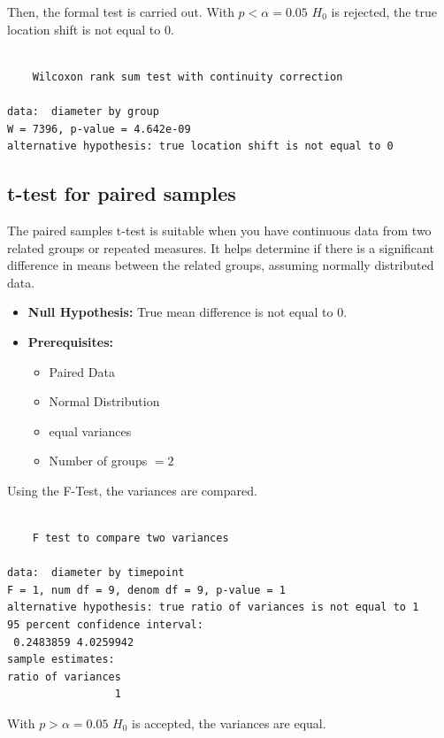 \documentclass[
  a4paper,
]{scrbook}
\providecommand{\tightlist}{%
  \setlength{\itemsep}{0pt}\setlength{\parskip}{0pt}}\usepackage{longtable,booktabs,array}
\begin{document}
Then, the formal test is carried out. With \(p<\alpha = 0.05\) \(H_0\)
is rejected, the true location shift is not equal to \(0\).

\begin{verbatim}

    Wilcoxon rank sum test with continuity correction

data:  diameter by group
W = 7396, p-value = 4.642e-09
alternative hypothesis: true location shift is not equal to 0
\end{verbatim}

\subsection{t-test for paired samples}\label{t-test-for-paired-samples}

The paired samples t-test is suitable when you have continuous data from
two related groups or repeated measures. It helps determine if there is
a significant difference in means between the related groups, assuming
normally distributed data.

\begin{itemize}
\tightlist
\item
  \textbf{Null Hypothesis:} True mean difference is not equal to 0.
\item
  \textbf{Prerequisites:}

  \begin{itemize}
  \tightlist
  \item
    Paired Data
  \item
    Normal Distribution
  \item
    equal variances
  \item
    Number of groups \(=2\)
  \end{itemize}
\end{itemize}

Using the F-Test, the variances are compared.

\begin{verbatim}

    F test to compare two variances

data:  diameter by timepoint
F = 1, num df = 9, denom df = 9, p-value = 1
alternative hypothesis: true ratio of variances is not equal to 1
95 percent confidence interval:
 0.2483859 4.0259942
sample estimates:
ratio of variances 
                 1 
\end{verbatim}

With \(p>\alpha = 0.05\) \(H_0\) is accepted, the variances are equal.
\end{document}
